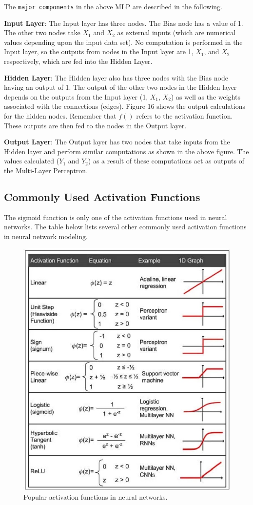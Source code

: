 \documentclass[
]{book}
\begin{document}
The \texttt{major\ components} in the above MLP are described in the following.

\textbf{Input Layer}: The Input layer has three nodes. The Bias node has a value of 1. The other two nodes take \(X_1\) and \(X_2\) as external inputs (which are numerical values depending upon the input data set). No computation is performed in the Input layer, so the outputs from nodes in the Input layer are 1, \(X_1\), and \(X_2\) respectively, which are fed into the Hidden Layer.

\textbf{Hidden Layer}: The Hidden layer also has three nodes with the Bias node having an output of 1. The output of the other two nodes in the Hidden layer depends on the outputs from the Input layer (1, \(X_1\), \(X_2\)) as well as the weights associated with the connections (edges). Figure 16 shows the output calculations for the hidden nodes. Remember that \(f()\) refers to the activation function. These outputs are then fed to the nodes in the Output layer.

\textbf{Output Layer}: The Output layer has two nodes that take inputs from the Hidden layer and perform similar computations as shown in the above figure. The values calculated (\(Y_1\) and \(Y_2\)) as a result of these computations act as outputs of the Multi-Layer Perceptron.

\hypertarget{commonly-used-activation-functions}{%
\subsection{Commonly Used Activation Functions}\label{commonly-used-activation-functions}}

The sigmoid function is only one of the activation functions used in neural networks. The table below lists several other commonly used activation functions in neural network modeling.

\begin{figure}

{\centering \includegraphics[width=0.6\linewidth]{img07/w07-commonlyUsedActivationFuns} 

}

\caption{Popular activation functions in neural networks.}\label{fig:unnamed-chunk-144}
\end{figure}
\end{document}
